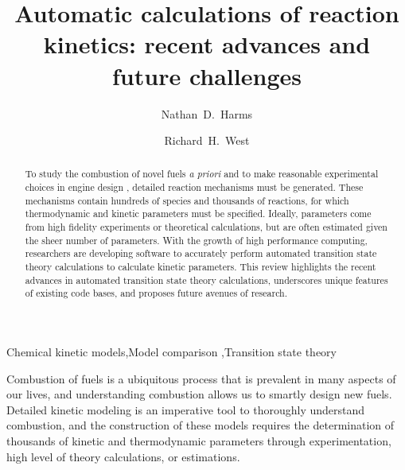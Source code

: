 \documentclass[preprint, 11pt]{elsarticle} %
\begin{document}
\begin{frontmatter}

\title{Automatic calculations of reaction kinetics: recent advances and future challenges}

\author[neu]{Nathan~D.~Harms}
\author[neu]{Richard~H.~West}%

\address[neu]{Department of Chemical Engineering\\
Northeastern University, Boston, MA 02115, USA}


\begin{abstract}

To study the combustion of novel fuels \textit{a priori} and to make reasonable experimental choices in engine design , detailed reaction mechanisms must be generated.
These mechanisms contain hundreds of species and thousands of reactions, for which thermodynamic and kinetic parameters must be specified.
Ideally, parameters come from high fidelity experiments or theoretical calculations, but are often estimated given the sheer number of parameters.
With the growth of high performance computing, researchers are developing software to accurately perform automated transition state theory calculations to calculate kinetic parameters. 
This review highlights the recent advances in automated transition state theory calculations, underscores unique features of existing code bases, and proposes future avenues of research.

\end{abstract}


\begin{keyword}
    Chemical kinetic models\sep Model comparison \sep Transition state theory
\end{keyword}

\end{frontmatter}

Combustion of fuels is a ubiquitous process that is prevalent in many aspects of our lives, and understanding combustion allows us to smartly design new fuels. 
Detailed kinetic modeling is an imperative tool to thoroughly understand combustion, and the construction of these models requires the determination of thousands of kinetic and thermodynamic parameters through experimentation, high level of theory calculations, or estimations. 

\end{document}
